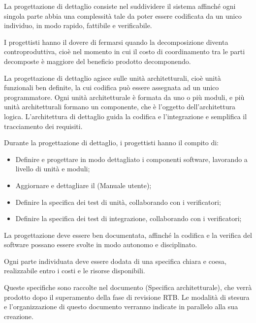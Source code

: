 \documentclass[10pt, a4paper]{article}
\begin{document}
\label{sec:progettazione_di_dettaglio}
La progettazione di dettaglio consiste nel suddividere il sistema affinché ogni singola parte abbia una complessità tale da poter essere codificata da un unico individuo, in modo rapido, fattibile e verificabile.

I progettisti hanno il dovere di fermarsi quando la decomposizione diventa controproduttiva, cioè nel momento in cui il costo di coordinamento tra le parti decomposte è maggiore del beneficio prodotto decomponendo.

La progettazione di dettaglio agisce sulle unità architetturali, cioè unità funzionali ben definite, la cui codifica può essere assegnata ad un unico programmatore.
Ogni unità architetturale è formata da uno o più moduli, e più unità architetturali formano un componente, che è l'oggetto dell'architettura logica.
L'architettura di dettaglio guida la codifica e l'integrazione e semplifica il tracciamento dei requisiti.

Durante la progettazione di dettaglio, i progettisti hanno il compito di:
\begin{itemize}
    \item Definire e progettare in modo dettagliato i componenti software, lavorando a livello di unità e moduli;
    \item Aggiornare e dettagliare il (Manuale utente);
    \item Definire la specifica dei test di unità, collaborando con i verificatori;
    \item Definire la specifica dei test di integrazione, collaborando con i verificatori;
\end{itemize}

La progettazione deve essere ben documentata, affinché la codifica e la verifica del software possano essere svolte in modo autonomo e disciplinato.

Ogni parte individuata deve essere dodata di una specifica chiara e coesa, realizzabile entro i costi e le risorse disponibili.

Queste specifiche sono raccolte nel documento (Specifica architetturale), che verrà prodotto dopo il superamento della fase di revisione RTB.
Le modalità di stesura e l'organizzazione di questo documento verranno indicate in parallelo alla sua creazione.
\end{document}
